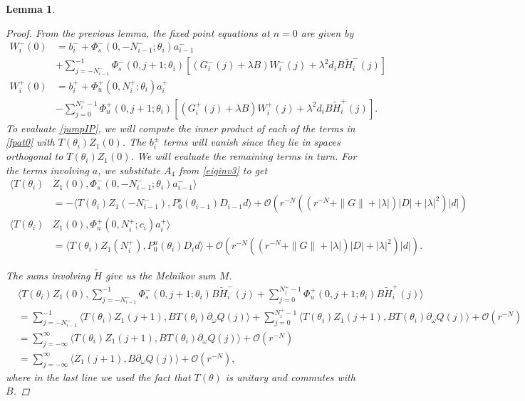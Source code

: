 \documentclass[12pt]{elsarticle}
\newtheorem{lemma}{Lemma}
\begin{document}
\begin{lemma}
\begin{proof}
From the previous lemma, the fixed point equations at $n = 0$ are given by 
\begin{equation}\label{fpat0}
\begin{aligned}
W_i^-(0) &= b_i^- +
\Phi_s^-(0, -N_{i-1}^-; \theta_i) a_{i-1}^- \\
&+ \sum_{j = -N_{i-1}^-}^{-1} \Phi_s^-(0, j+1; \theta_i)
[(G_i^-(j) + \lambda B) W_i^-(j) + \lambda^2 d_i B \tilde{H}_i^-(j)] \\
W_i^+(0) &= b_i^+ + \Phi_u^+(0, N_i^+; \theta_i) a_i^+ \\
&- \sum_{j = 0}^{N_i^+-1} \Phi_u^+(0, j+1; \theta_i) 
[(G_i^+(j) + \lambda B) W_i^+(j) + \lambda^2 d_i B \tilde{H}_i^+(j)].
\end{aligned}
\end{equation}
To evaluate \cref{jumpIP}, we will compute the inner product of each of the terms in \cref{fpat0} with $T(\theta_i)Z_1(0)$. The $b_i^\pm$ terms will vanish since they lie in spaces orthogonal to $T(\theta_i) Z_1(0)$. We will evaluate the remaining terms in turn. For the terms involving $a$, we substitute $A_4$ from \cref{eiginv3} to get
\begin{align*}
\langle T(\theta_i) &Z_1(0), \Phi_s^-(0, -N_{i-1}^-; \theta_i) a_{i-1}^- \rangle \\
&= -\langle T(\theta_i) Z_1(-N_{i-1}^-), P_0^s(\theta_{i-1}) D_{i-1} d \rangle + \mathcal{O}\left(r^{-N}( (r^{-N} + \|G\| + |\lambda|)|D| + |\lambda|^2 )|d| \right) \\
\langle T(\theta_i) &Z_1(0), \Phi_u^+(0, N_i^+; c_i) a_i^+ \rangle \\
&= \langle T(\theta_i) Z_1(N_i^+), P_0^u(\theta_i) D_i d \rangle + \mathcal{O}\left(r^{-N}( (r^{-N} + \|G\| + |\lambda|)|D| + |\lambda|^2 )|d| \right).
\end{align*}

The sums involving $\tilde{H}$ give us the Melnikov sum $M$.
\begin{align*}
&\langle T(\theta_i) Z_1(0), \sum_{j = -N_{i-1}^-}^{-1} \Phi_s^-(0, j+1; \theta_i) B \tilde{H}_i^-(j) + \sum_{j = 0}^{N_i^+-1} \Phi_u^+(0, j+1; \theta_i) B \tilde{H}_i^+(j) \rangle \\
&= \sum_{j = -N_{i-1}^-}^{-1} \langle T(\theta_i) Z_1(j+1), B T(\theta_i) \partial_\omega Q(j) \rangle + \sum_{j = 0}^{N_i^+-1} \langle T(\theta_i) Z_1(j+1), B T(\theta_i)  \partial_\omega Q(j) \rangle + \mathcal{O}(r^{-N})\\
&= \sum_{j = -\infty}^{\infty} \langle T(\theta_i) Z_1(j+1), B T(\theta_i)  \partial_\omega Q(j)\rangle + \mathcal{O}(r^{-N}) \\
&= \sum_{j = -\infty}^{\infty} \langle Z_1(j+1), B  \partial_\omega Q(j) \rangle + \mathcal{O}(r^{-N}),
\end{align*}
where in the last line we used the fact that $T(\theta)$ is unitary and commutes with $B$.


\end{proof}
\end{lemma}
\end{document}
